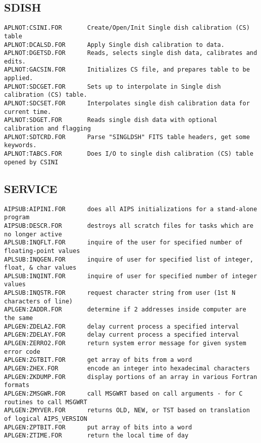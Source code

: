 \subsection{SDISH}
\begin{verbatim}
APLNOT:CSINI.FOR       Create/Open/Init Single dish calibration (CS) table
APLNOT:DCALSD.FOR      Apply Single dish calibration to data.
APLNOT:DGETSD.FOR      Reads, selects single dish data, calibrates and edits.
APLNOT:GACSIN.FOR      Initializes CS file, and prepares table to be applied.
APLNOT:SDCGET.FOR      Sets up to interpolate in Single dish calibration (CS) table.
APLNOT:SDCSET.FOR      Interpolates single dish calibration data for current time.
APLNOT:SDGET.FOR       Reads single dish data with optional calibration and flagging
APLNOT:SDTCRD.FOR      Parse "SINGLDSH" FITS table headers, get some keywords.
APLNOT:TABCS.FOR       Does I/O to single dish calibration (CS) table opened by CSINI
\end{verbatim}
 
\subsection{SERVICE}
\begin{verbatim}
AIPSUB:AIPINI.FOR      does all AIPS initializations for a stand-alone program
AIPSUB:DESCR.FOR       destroys all scratch files for tasks which are no longer active
APLSUB:INQFLT.FOR      inquire of the user for specified number of floating-point values
APLSUB:INQGEN.FOR      inquire of user for specified list of integer, float, & char values
APLSUB:INQINT.FOR      inquire of user for specified number of integer values
APLSUB:INQSTR.FOR      request character string from user (1st N characters of line)
APLGEN:ZADDR.FOR       determine if 2 addresses inside computer are the same
APLGEN:ZDELA2.FOR      delay current process a specified interval
APLGEN:ZDELAY.FOR      delay current process a specified interval
APLGEN:ZERRO2.FOR      return system error message for given system error code
APLGEN:ZGTBIT.FOR      get array of bits from a word
APLGEN:ZHEX.FOR        encode an integer into hexadecimal characters
APLGEN:ZKDUMP.FOR      display portions of an array in various Fortran formats
APLGEN:ZMSGWR.FOR      call MSGWRT based on call arguments - for C routines to call MSGWRT
APLGEN:ZMYVER.FOR      returns OLD, NEW, or TST based on translation of logical AIPS_VERSION
APLGEN:ZPTBIT.FOR      put array of bits into a word
APLGEN:ZTIME.FOR       return the local time of day
\end{verbatim}
 
